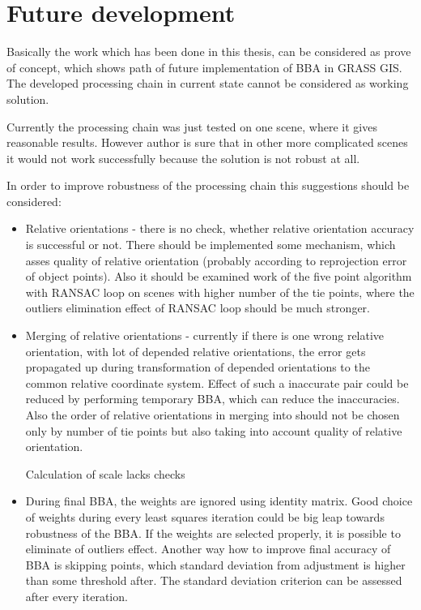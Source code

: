 \documentclass[a4paper,12pt]{article}
\begin{document}

\section{Future development}


Basically the work which has been done in this thesis, can be considered as prove of concept,
which shows path of future implementation of BBA in GRASS GIS. The developed 
processing chain in current state cannot be considered as working solution.

Currently  the processing chain was just tested 
 on one scene, where it gives reasonable results. However 
author is sure that in other more complicated scenes it would not work successfully because 
the solution is not robust at all.

In order to improve robustness of the processing chain this suggestions should be considered:
\begin{itemize}
\item Relative orientations - there is no check, whether relative orientation accuracy is successful or not. There 
should be implemented some mechanism, which asses quality of relative orientation (probably according to reprojection error of object points).
Also it should be examined work of the five point algorithm with RANSAC loop on scenes with higher number of the tie points, where 
the outliers elimination effect of RANSAC loop should be much stronger.
\item  Merging of relative orientations - currently if there is one wrong relative orientation, with lot of depended relative orientations,
the error gets propagated up during transformation of depended orientations to the common relative coordinate system. 
Effect of such a inaccurate pair could be 
reduced by performing  temporary BBA, which can reduce the inaccuracies. Also the order of relative orientations in merging 
into  should not 
be chosen only by number of tie points but also taking into account quality of relative orientation.

Calculation of scale lacks checks 

\item During final BBA, the weights are ignored using identity matrix. Good choice of weights during every least squares iteration 
could be big leap towards robustness of the BBA. If the weights are selected properly, it is possible to eliminate of outliers 
effect.
Another way how to improve final accuracy of BBA is skipping points, which 
standard deviation from adjustment is higher than some threshold after. The standard deviation criterion can be assessed 
after every iteration.
\end{itemize}
\end{document}
